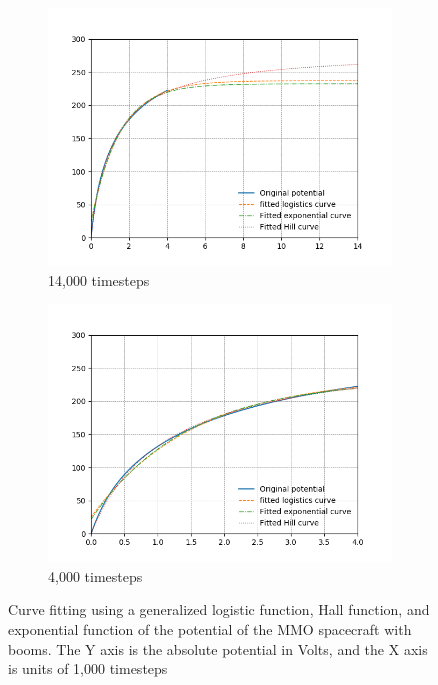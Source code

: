 \begin{center}
\begin{figure}[H]
  \begin{subfigure}[b]{0.61\textwidth}
    \includegraphics[width=\textwidth]{figures/Appendix/C_fit_WB.png}
    \caption{14,000 timesteps}
    \label{fig:C_fit_NB}
  \end{subfigure}
  \hfill
  \begin{subfigure}[b]{0.61\textwidth}
    \includegraphics[width=\textwidth]{figures/Appendix/C_fit_WB_lim.png}
    \caption{4,000 timesteps}
    \label{fig:C_fit_NB_lim}
  \end{subfigure}
  \label{fig:Pot_noPH}
  \caption{Curve fitting using a generalized logistic function, Hall function, and exponential function of the potential of the MMO spacecraft with booms. The Y axis is the absolute potential in Volts, and the X axis is units of 1,000 timesteps}
\end{figure}
\end{center}


